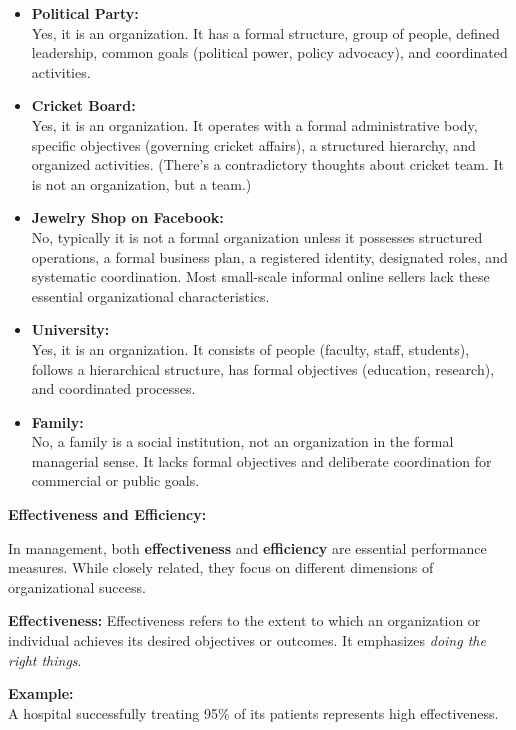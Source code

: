 \documentclass[10pt,a4paper]{book}
\begin{document}
\begin{itemize}
    \item \textbf{Political Party:} \\
    Yes, it is an organization. It has a formal structure, group of people, defined leadership, common goals (political power, policy advocacy), and coordinated activities.
    
    \item \textbf{Cricket Board:} \\
    Yes, it is an organization. It operates with a formal administrative body, specific objectives (governing cricket affairs), a structured hierarchy, and organized activities. (There's a contradictory thoughts about cricket team. It is not an organization, but a team.) 

    \item \textbf{Jewelry Shop on Facebook:} \\
    No, typically it is not a formal organization unless it possesses structured operations, a formal business plan, a registered identity, designated roles, and systematic coordination. Most small-scale informal online sellers lack these essential organizational characteristics.
    
    \item \textbf{University:} \\
    Yes, it is an organization. It consists of people (faculty, staff, students), follows a hierarchical structure, has formal objectives (education, research), and coordinated processes.

    \item \textbf{Family:} \\
    No, a family is a social institution, not an organization in the formal managerial sense. It lacks formal objectives and deliberate coordination for commercial or public goals.
\end{itemize}


\textbf{Effectiveness and Efficiency:}

In management, both \textbf{effectiveness} and \textbf{efficiency} are essential performance measures. While closely related, they focus on different dimensions of organizational success.

\textbf{Effectiveness:}
Effectiveness refers to the extent to which an organization or individual achieves its desired objectives or outcomes. It emphasizes \textit{doing the right things}.

\textbf{Example:}\\
A hospital successfully treating 95\% of its patients represents high effectiveness.
\end{document}
